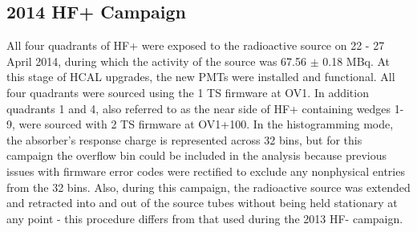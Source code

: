 
\subsection{2014 HF+ Campaign}
All four quadrants of HF+ were exposed to the radioactive source on 22 - 27 April
2014, during which the activity of the source was 67.56 $\pm$ 0.18 \unit{MBq}.
At this stage of HCAL upgrades, the new PMTs were installed and functional.
All four quadrants were sourced using the 1 TS firmware at OV1. In addition quadrants 1 and 4, also referred to as the near side of HF+ containing wedges
1-9, were sourced with 2 TS firmware at OV1+100. In the histogramming mode, the
absorber's response charge is represented across 32 bins, but for this campaign
the overflow bin could be included in the analysis because previous issues with
firmware error codes were rectified to exclude any nonphysical entries from the
32 bins. Also, during this campaign, the radioactive source was extended and
retracted into and out of the source tubes without being held stationary at any
point - this procedure differs from that used during the 2013 HF- campaign.


